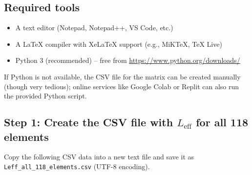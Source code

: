 \documentclass[11pt,a4paper]{article}
\begin{document}
	\subsection*{Required tools}
	\begin{itemize}
		\item A text editor (Notepad, Notepad++, VS Code, etc.)
		\item A LaTeX compiler with XeLaTeX support (e.g., MiKTeX, TeX Live)
		\item Python 3 (recommended) – free from \url{https://www.python.org/downloads/}
	\end{itemize}
	If Python is not available, the CSV file for the matrix can be created manually (though very tedious); online services like Google Colab or Replit can also run the provided Python script.
	
	\subsection*{Step 1: Create the CSV file with \(L_{\mathrm{eff}}\) for all 118 elements}
	Copy the following CSV data into a new text file and save it as \texttt{Leff\_all\_118\_elements.csv} (UTF-8 encoding).
	
\end{document}
